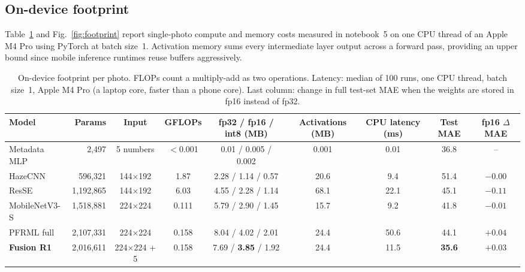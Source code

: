 \documentclass[conference]{IEEEtran}
\begin{document}
\subsection{On-device footprint}

Table~\ref{tab:footprint} and Fig.~\ref{fig:footprint} report single-photo
compute and memory costs measured in notebook~5 on one CPU thread of an Apple M4
Pro using PyTorch at batch size~1. Activation memory sums every intermediate
layer output across a forward pass, providing an upper bound since mobile
inference runtimes reuse buffers aggressively.

\begin{table}[!t]
  \centering
  \caption{
    On-device footprint per photo. FLOPs count a multiply-add as two operations.
    Latency: median of 100 runs, one CPU thread, batch size~1, Apple M4 Pro (a
    laptop core, faster than a phone core). Last column: change in full test-set
    MAE when the weights are stored in fp16 instead of fp32.
  }
  \label{tab:footprint}
  \setlength{\tabcolsep}{5pt}
  \begin{tabular}{lrccccccc}
    \toprule
    Model              &    Params &       Input        &  GFLOPs  &   fp32 / fp16 / int8 (MB)   & Activations (MB) & CPU latency (ms) &   Test MAE    & fp16 $\Delta$MAE \\
    \midrule
    Metadata MLP       &     2,497 &     5 numbers      & $<$0.001 &    0.01 / 0.005 / 0.002     &      0.001       &       0.01       &     36.8      &        --        \\
    HazeCNN            &   596,321 &   144$\times$192   &   1.87   &     2.28 / 1.14 / 0.57      &       20.6       &       9.4        &     51.4      &     $-0.00$      \\
    ResSE              & 1,192,865 &   144$\times$192   &   6.03   &     4.55 / 2.28 / 1.14      &       68.1       &       22.1       &     45.1      &     $-0.11$      \\
    MobileNetV3-S      & 1,518,881 &   224$\times$224   &  0.111   &     5.79 / 2.90 / 1.45      &       15.7       &       9.2        &     41.8      &     $-0.01$      \\
    PFRML full         & 2,107,331 &   224$\times$224   &  0.158   &     8.04 / 4.02 / 2.01      &       24.4       &       50.6       &     44.1      &     $+0.04$      \\
    \textbf{Fusion R1} & 2,016,611 & 224$\times$224 + 5 &  0.158   & 7.69 / \textbf{3.85} / 1.92 &       24.4       &       11.5       & \textbf{35.6} &     $+0.03$      \\
    \bottomrule
  \end{tabular}
\end{table}
\end{document}

